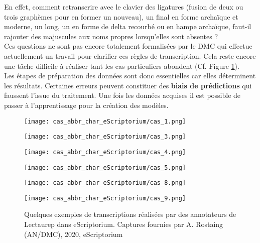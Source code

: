 En effet, comment retranscrire avec le clavier des ligatures (fusion de deux ou trois graphèmes pour en former un nouveau), un  final en forme archaïque et moderne, un  long, un  en forme de delta recourbé ou en hampe archaïque, faut-il rajouter des majuscules aux noms propres lorsqu'elles sont absentes ?\\

Ces questions ne sont pas encore totalement formalisées par le DMC qui effectue actuellement un travail pour clarifier ces règles de transcription. Cela reste encore une tâche difficile à réaliser tant les cas particuliers abondent (Cf. Figure \ref{fig:exemples_eScriptorium}).\\

Les étapes de préparation des données sont donc essentielles car elles déterminent les résultats. Certaines erreurs peuvent constituer des \textbf{biais de prédictions} qui faussent l'issue du traitement. Une fois les données acquises il est possible de passer à l'apprentissage pour la création des modèles. 

\begin{figure}[h!]
    \begin{minipage}[c]{.46\linewidth} 
        \centering
        \texttt{[image: cas\_abbr\_char\_eScriptorium/cas\_1.png]}
        \end{minipage}
    \hfill%
    \begin{minipage}[c]{.46\linewidth}
        \centering
        \texttt{[image: cas\_abbr\_char\_eScriptorium/cas\_3.png]}
    \end{minipage}
    \hfill%
    \begin{minipage}[c]{.46\linewidth}
        \centering
        \texttt{[image: cas\_abbr\_char\_eScriptorium/cas\_4.png]}
    \end{minipage}
    \hfill%
    \begin{minipage}[c]{.46\linewidth}
        \centering
        \texttt{[image: cas\_abbr\_char\_eScriptorium/cas\_5.png]}
    \end{minipage}
    \hfill%
    \begin{minipage}[c]{.46\linewidth}
        \centering
        \texttt{[image: cas\_abbr\_char\_eScriptorium/cas\_8.png]}
    \end{minipage}
    \hfill%
    \begin{minipage}[c]{.46\linewidth}
        \centering
        \texttt{[image: cas\_abbr\_char\_eScriptorium/cas\_9.png]}
    \end{minipage}
        \caption{Quelques exemples de transcriptions réalisées par des annotateurs de Lectaurep dans eScriptorium. \textcopyright Captures fournies par A. Rostaing (AN/DMC), 2020, eScriptorium}
    \label{fig:exemples_eScriptorium}
\end{figure}
\newpage
